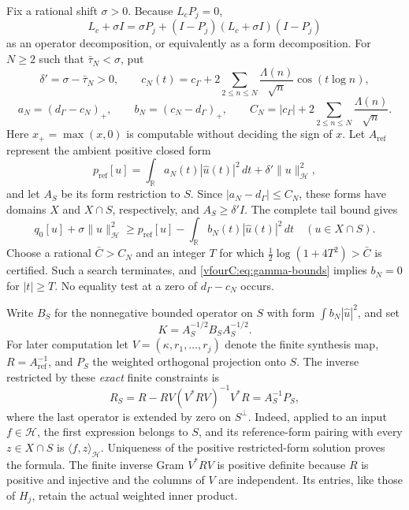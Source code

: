 \documentclass[11pt,a4paper]{article}
\numberwithin{equation}{section}
\theoremstyle{definition}\newtheorem{definition}[theorem]{Definition}
\theoremstyle{remark}\newtheorem{remark}[theorem]{Remark}
\newcommand{\R}{\mathbb R}\newcommand{\C}{\mathbb C}\newcommand{\N}{\mathbb N}
\newcommand{\Hh}{\mathcal H}\newcommand{\Hw}{\mathcal H}
\newcommand{\ip}[2]{\langle#1,#2\rangle}\newcommand{\norm}[1]{\lVert#1\rVert}\newcommand{\abs}[1]{\lvert#1\rvert}
\begin{document}
Fix a rational shift $\sigma>0$.  Because $L_cP_j=0$,
\begin{equation}\label{vfourC:eq:null-decomposition}
 L_c+\sigma I
   =\sigma P_j+(I-P_j)(L_c+\sigma I)(I-P_j)
\end{equation}
as an operator decomposition, or equivalently as a form decomposition.  For
$N\ge2$ such that $\bar\tau_N<\sigma$, put
\[
 \delta'=\sigma-\bar\tau_N>0,\qquad
 c_N(t)=c_\Gamma+2\sum_{2\le n\le N}\frac{\Lambda(n)}{\sqrt n}
                                  \cos(t\log n),
\]
\[
 a_N=(d_\Gamma-c_N)_+,\qquad b_N=(c_N-d_\Gamma)_+,\qquad
 C_N=|c_\Gamma|+2\sum_{2\le n\le N}\frac{\Lambda(n)}{\sqrt n}.
\]
Here $x_+=\max(x,0)$ is computable without deciding the sign of $x$.
Let $A_{\mathrm{ref}}$ represent the ambient positive closed form
\begin{equation}\label{vfourC:eq:reference-form}
 p_{\mathrm{ref}}[u]=\int_{\R}a_N(t)|\widehat u(t)|^2\,dt
                         +\delta'\norm u_{\Hh}^2,
\end{equation}
and let $A_S$ be its form restriction to $S$.  Since
$|a_N-d_\Gamma|\le C_N$, these forms have domains $X$ and $X\cap S$,
respectively, and $A_S\ge\delta'I$.  The complete tail bound gives
\begin{equation}\label{vfourC:eq:head-comparison}
 q_0[u]+\sigma\norm u_{\Hh}^2
 \ge p_{\mathrm{ref}}[u]-\int_{\R}b_N(t)|\widehat u(t)|^2\,dt
 \quad(u\in X\cap S).
\end{equation}
Choose a rational $\bar C>C_N$ and an integer $T$ for which
$\tfrac12\log(1+4T^2)>\bar C$ is certified.  Such a search terminates, and
\eqref{vfourC:eq:gamma-bounds} implies $b_N=0$ for $|t|\ge T$.
No equality test at a zero of $d_\Gamma-c_N$ occurs.

Write $B_S$ for the nonnegative bounded operator on $S$ with form
$\int b_N|\widehat u|^2$, and set
\begin{equation}\label{vfourC:eq:BS}
 K=A_S^{-1/2}B_SA_S^{-1/2}.
\end{equation}
For later computation let $V=(\kappa,r_1,\ldots,r_j)$ denote the finite synthesis
map, $R=A_{\mathrm{ref}}^{-1}$, and $P_S$ the weighted orthogonal projection onto
$S$.  The inverse restricted by these \emph{exact} finite constraints is
\begin{equation}\label{vfourC:eq:restricted-inverse}
 R_S=R-RV(V^*RV)^{-1}V^*R=A_S^{-1}P_S,
\end{equation}
where the last operator is extended by zero on $S^\perp$.
Indeed, applied to an input $f\in\Hh$, the first expression belongs to $S$,
and its reference-form pairing with every $z\in X\cap S$ is
$\ip{f}{z}_{\Hh}$.
Uniqueness of the positive restricted-form solution proves the formula.
The finite inverse Gram $V^*RV$ is positive definite because $R$ is positive
and injective and the columns of $V$ are independent.  Its entries, like those
of $H_j$, retain the actual weighted inner product.
\end{document}
